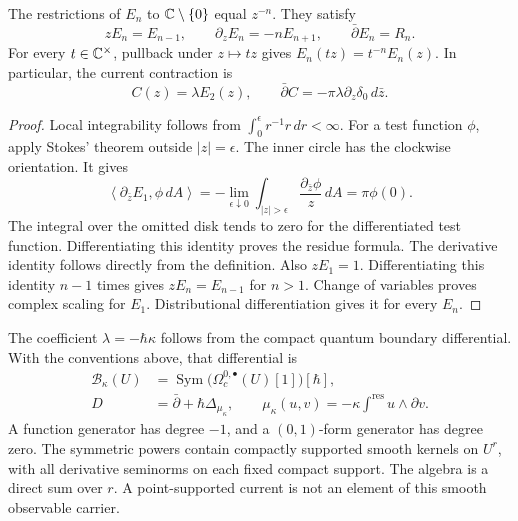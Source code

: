 \begin{lemma}
\label{lem:cd-residue}
The restrictions of $E_n$ to $\mathbb C\setminus\{0\}$ equal $z^{-n}$.
They satisfy
\begin{equation}
 \label{eq:cd-residue}
 zE_n=E_{n-1},\qquad
 \partial_zE_n=-nE_{n+1},\qquad
 \bar\partial E_n=R_n.
\end{equation}
For every $t\in\mathbb C^\times$, pullback under $z\mapsto tz$ gives
$E_n(tz)=t^{-n}E_n(z)$.  In particular, the current contraction is
\begin{equation}
 \label{eq:cd-double-contact}
 C(z)=\lambda E_2(z),\qquad
 \bar\partial C=-\pi\lambda\partial_z\delta_0\,d\bar z.
\end{equation}
\end{lemma}
\begin{proof}
Local integrability follows from $\int_0^\epsilon r^{-1}r\,dr<\infty$.
For a test function $\phi$, apply Stokes' theorem outside $|z|=\epsilon$.
The inner circle has the clockwise orientation.  It gives
\[
 \left\langle\partial_{\bar z}E_1,\phi\,dA\right\rangle
 =-\lim_{\epsilon\downarrow0}\int_{|z|>\epsilon}
                 \frac{\partial_{\bar z}\phi}{z}\,dA
 =\pi\phi(0).
\]
The integral over the omitted disk tends to zero for the differentiated
test function.  Differentiating this identity proves the residue formula.
The derivative identity follows directly from the definition.
Also $zE_1=1$.  Differentiating this identity $n-1$ times gives
$zE_n=E_{n-1}$ for $n>1$.
Change of variables proves complex scaling for $E_1$.
Distributional differentiation gives it for every $E_n$.
\end{proof}

The coefficient $\lambda=-\hbar\kappa$ follows from the compact quantum
boundary differential.  With the conventions above, that differential is
\begin{equation}
 \label{eq:cd-boundary-carrier}
 \begin{split}
 \mathcal B_\kappa(U)&=
 \operatorname{Sym}\bigl(\Omega_c^{0,\bullet}(U)[1]\bigr)[\hbar],\\
 D&=\bar\partial+\hbar\Delta_{\mu_\kappa},\qquad
 \mu_\kappa(u,v)=-\kappa\int^{\mathrm{res}}u\wedge\partial v.
 \end{split}
\end{equation}
A function generator has degree $-1$, and a $(0,1)$-form generator has degree
zero.  The symmetric powers contain compactly supported smooth kernels
on $U^r$, with all derivative seminorms on each fixed compact support.
The algebra is a direct sum over $r$.  A point-supported current is not
an element of this smooth observable carrier.

